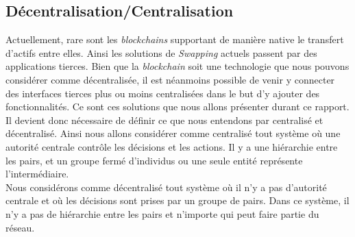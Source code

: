 \subsection{Décentralisation/Centralisation}
Actuellement, rare sont les \textit{\gls{blockchain}s} supportant de manière native le transfert d'\gls{actif}s entre elles. Ainsi les solutions
de \textit{Swapping} actuels passent par des applications tierces. Bien que la \textit{\gls{blockchain}} soit une technologie que nous 
pouvons considérer comme décentralisée, il est néanmoins possible de venir y connecter des interfaces tierces plus ou 
moins centralisées dans le but d'y ajouter des fonctionnalités. Ce sont ces solutions que nous allons présenter durant ce rapport. \\
Il devient donc nécessaire de définir ce que nous entendons par centralisé et décentralisé. Ainsi nous allons considérer comme
centralisé tout système où une autorité centrale contrôle les décisions et les actions. 
Il y a une hiérarchie entre les pairs, et un groupe fermé d’individus ou une seule entité représente l’intermédiaire. \\
Nous considérons comme décentralisé tout système où il n’y a pas d’autorité centrale et où les décisions sont prises 
par un groupe de pairs. Dans ce système, il n’y a pas de hiérarchie entre les pairs et n'importe qui peut faire partie
du réseau.
